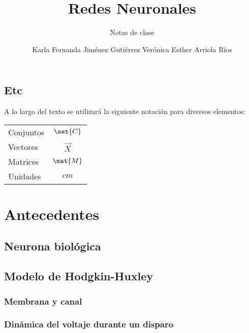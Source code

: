 \documentclass[12pt,openany]{book}
\title{Redes Neuronales}
\subtitle{Notas de clase}
\author{Karla Fernanda Jiménez Gutiérrez\newline
        Verónica Esther Arriola Ríos}
\begin{document}
\maketitle

\frontmatter %
\tableofcontents
\clearemptydoublepage %


\mainmatter  %


\chapter*{Etc}

A lo largo del texto se utilizará la siguiente notación para diversos elementos:
\begin{longtable}{lc}
 Conjuntos   &   $\set{C}$ \\
 Vectores    &   $\vec{X}$ \\
 Matrices    &   $\mat{M}$ \\
 Unidades    &   $\unit{cm}$
\end{longtable}



\part{Antecedentes}
\chapter{Neurona biológica}




\chapter{Modelo de Hodgkin-Huxley}
\section{Membrana y canal}
\section{Dinámica del voltaje durante un disparo}
\end{document}
